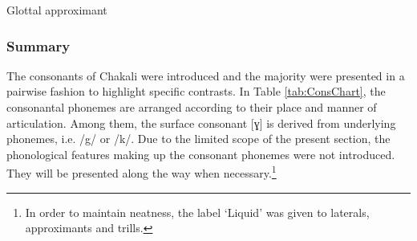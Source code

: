 \begin{table} 

\caption{Glottal  approximant\label{tab:glot-approx}}

\quad
{}
\end{table}




\newpage 
\subsubsection{Summary} 
\label{sec:sum-consonant}

The consonants of Chakali were introduced and the majority were
presented in a pairwise fashion to highlight specific contrasts. In Table
\ref{tab:ConsChart},  the  consonantal phonemes are arranged according to their
place and manner of articulation. Among them,  the surface consonant [ɣ] is 
derived from underlying phonemes, i.e. {/g/} or  { /k/}.   Due to the
limited scope of the present section,  the phonological
features making up the consonant phonemes were not introduced. They will be
presented along the way
when necessary.\footnote{In order to maintain neatness, the label `Liquid' was given to laterals, approximants and trills.}


